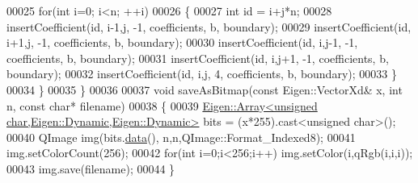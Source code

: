 \begin{DoxyCode}
00025     \textcolor{keywordflow}{for}(\textcolor{keywordtype}{int} i=0; i<n; ++i)
00026     \{
00027       \textcolor{keywordtype}{int} \textcolor{keywordtype}{id} = i+j*n;
00028       insertCoefficient(\textcolor{keywordtype}{id}, i-1,j, -1, coefficients, b, boundary);
00029       insertCoefficient(\textcolor{keywordtype}{id}, i+1,j, -1, coefficients, b, boundary);
00030       insertCoefficient(\textcolor{keywordtype}{id}, i,j-1, -1, coefficients, b, boundary);
00031       insertCoefficient(\textcolor{keywordtype}{id}, i,j+1, -1, coefficients, b, boundary);
00032       insertCoefficient(\textcolor{keywordtype}{id}, i,j,    4, coefficients, b, boundary);
00033     \}
00034   \}
00035 \}
00036 
00037 \textcolor{keywordtype}{void} saveAsBitmap(\textcolor{keyword}{const} Eigen::VectorXd& x, \textcolor{keywordtype}{int} n, \textcolor{keyword}{const} \textcolor{keywordtype}{char}* filename)
00038 \{
00039   \hyperlink{group___core___module_class_eigen_1_1_array}{Eigen::Array<unsigned char,Eigen::Dynamic,Eigen::Dynamic>}
       bits = (x*255).cast<unsigned char>();
00040   QImage img(bits.\hyperlink{class_eigen_1_1_plain_object_base_ac25699535374b1854cf8494e44ad31b2}{data}(), n,n,QImage::Format\_Indexed8);
00041   img.setColorCount(256);
00042   \textcolor{keywordflow}{for}(\textcolor{keywordtype}{int} i=0;i<256;i++) img.setColor(i,qRgb(i,i,i));
00043   img.save(filename);
00044 \}
\end{DoxyCode}
